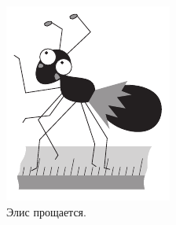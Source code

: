 \begin{figure}[ht!]
\centering
\includegraphics[scale=1]{pics/alice2}
\caption{Элис прощается.}
\label{pic:alice2}
\end{figure}
